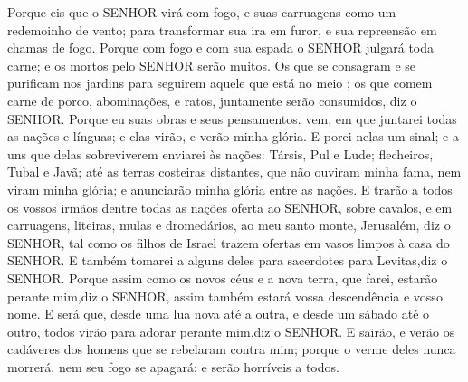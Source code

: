 {  Porque eis que o SENHOR virá com fogo, e suas carruagens como um redemoinho de vento; para transformar sua ira em furor, e sua repreensão em chamas de fogo.
  Porque com fogo e com sua espada o SENHOR julgará toda carne; e os mortos pelo SENHOR serão muitos.
  Os que se consagram e se purificam nos jardins para seguirem aquele
 que está no meio
{} ; os que comem carne de porco, abominações, e ratos, juntamente serão consumidos, diz o SENHOR.
  Porque eu
{} suas obras e seus pensamentos.
{} vem, em que juntarei todas as nações e línguas; e elas virão, e verão minha glória.
  E porei nelas um sinal; e a uns que delas sobreviverem enviarei às nações:
{} Társis, Pul e Lude;
{} flecheiros,
{} Tubal e Javã; até as terras costeiras
{} distantes, que não ouviram minha fama, nem viram minha glória; e anunciarão minha glória entre as nações.
  E trarão a todos os vossos irmãos dentre todas as nações
{} oferta ao SENHOR, sobre cavalos, e em carruagens, liteiras, mulas e dromedários, ao meu santo monte,
{} Jerusalém, diz o SENHOR, tal como os filhos de Israel trazem ofertas em vasos limpos à casa do SENHOR.
  E também tomarei a alguns deles para
{} sacerdotes
{} para Levitas,diz o SENHOR.
  Porque assim como os novos céus e a nova terra, que farei, estarão perante mim,diz o SENHOR, assim também estará vossa descendência
 e vosso nome.
  E será que, desde uma lua nova até a outra, e desde um sábado até o outro, todos
 virão para adorar perante mim,diz o SENHOR.
  E sairão, e verão os cadáveres dos homens que se rebelaram contra mim; porque o verme deles nunca morrerá, nem seu fogo se apagará; e serão horríveis a todos.\par }

